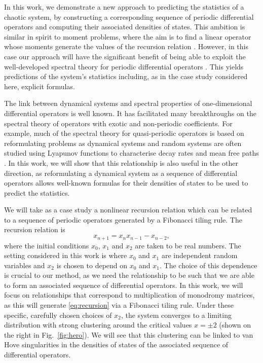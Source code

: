 \documentclass[nofootinbib,prb,amsmath,amssymb,twocolumn,floatfix]{revtex4-2}
\theoremstyle{definition}
\begin{document}



In this work, we demonstrate a new approach to predicting the statistics of a chaotic system, by constructing a corresponding sequence of periodic differential operators and computing their associated densities of states. This ambition is similar in spirit to moment problems, where the aim is to find a linear operator whose moments generate the values of the recursion relation \cite{akhiezer2020classical, el2004recursive, taher2009complex}. However, in this case our approach will have the significant benefit of being able to exploit the well-developed spectral theory for periodic differential operators \cite{kuchment2016overview}. This yields predictions of the system's statistics including, as in the case study considered here, explicit formulas.

The link between dynamical systems and spectral properties of one-dimensional differential operators is well known. It has facilitated many breakthroughs on the spectral theory of operators with exotic and non-periodic coefficients. For example, much of the spectral theory for quasi-periodic operators is based on reformulating problems as dynamical systems \cite{simon1982almost, avila2009ten, surace1990schrodinger} and random systems are often studied using Lyapunov functions to characterise decay rates and mean free paths \cite{borland1963nature, carmona1982exponential, comtet2013lyapunov, scales1997lyapunov}. In this work, we will show that this relationship is also useful in the other direction, as reformulating a dynamical system as a sequence of differential operators allows well-known formulas for their densities of states to be used to predict the statistics.

We will take as a case study a nonlinear recursion relation which can be related to a sequence of periodic operators generated by a Fibonacci tiling rule. The recursion relation is 
\begin{equation} \label{eq:recursion}
	x_{n+1} = x_n x_{n-1} - x_{n-2},
\end{equation}
where the initial conditions $x_0$, $x_1$ and $x_2$ are taken to be real numbers. The setting considered in this work is where $x_0$ and $x_1$ are independent random variables and $x_2$ is chosen to depend on $x_0$ and $x_1$. The choice of this dependence is crucial to our method, as we need the relationship to be such that we are able to form an associated sequence of differential operators. In this work, we will focus on relationships that correspond to multiplication of monodromy matrices, as this will generate \eqref{eq:recursion} via a Fibonacci tiling rule. Under these specific, carefully chosen choices of $x_2$, the system converges to a limiting distribution with strong clustering around the critical values $x=\pm2$ (shown on the right in Fig.~\ref{fig:hero}). We will see that this clustering can be linked to van Hove singularities in the densities of states of the associated sequence of differential operators. %
\end{document}

